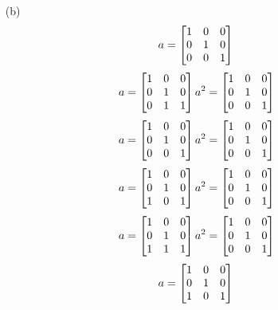 \begin{mdframed}[style=darkAnswer,frametitle={Joe Starr}]
\begin{itemize}
{We observe that every element is order 3 meaning exponent of $G$ is 3. 
}
  \item[(b)]{
  $$a= \begin{bmatrix}1&0&0\\0&1&0\\0&0&1\end{bmatrix} \\
    $$
    $$a= \begin{bmatrix}1&0&0\\0&1&0\\0&1&1\end{bmatrix} \\
    a^{ 2 }={ \begin{bmatrix}1&0&0\\0&1&0\\0&0&1\end{bmatrix} }
    $$
    $$a= \begin{bmatrix}1&0&0\\0&1&0\\0&0&1\end{bmatrix} \\
    a^{ 2 }={ \begin{bmatrix}1&0&0\\0&1&0\\0&0&1\end{bmatrix} }
    $$
    $$a= \begin{bmatrix}1&0&0\\0&1&0\\1&0&1\end{bmatrix} \\
    a^{ 2 }={ \begin{bmatrix}1&0&0\\0&1&0\\0&0&1\end{bmatrix} }
    $$
    $$a= \begin{bmatrix}1&0&0\\0&1&0\\1&1&1\end{bmatrix} \\
    a^{ 2 }={ \begin{bmatrix}1&0&0\\0&1&0\\0&0&1\end{bmatrix} }
    $$
    $$a= \begin{bmatrix}1&0&0\\0&1&0\\1&0&1\end{bmatrix} \\
$$}
\end{itemize}
\end{mdframed}
